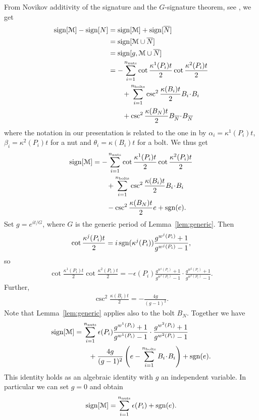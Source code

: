 \documentclass[a4paper,10pt,reqno]{amsart}
\newcommand{\nut}{P}
\newcommand{\bolt}{B}
\newcommand{\sgn}{\mathop{\rm sgn}}
\newcommand{\sign}{\mathop{\rm sign}}
\newcommand{\cM}{\mathcal{M}}
\theoremstyle{plain}
\newcommand{\nnuts}{n_{\text{\rm nuts}}}
\newcommand{\nbolts}{n_{\text{\rm bolts}}}
\numberwithin{equation}{section}
\begin{document}
From Novikov additivity of the signature and the $G$-signature theorem, see \cite[Prop.~6.18]{AS-III}, we get
\begin{align}
\sign[\cM] - \sign[N] 
&=\sign[\cM] + \sign[\overline{N}] \\
&= \sign[\cM \cup \overline{N}] \\
&= \sign[g,\cM \cup \overline{N}] \\
%
%
%
%
&= - \sum_{i=1}^{\nnuts} \cot\frac{\kappa^1(\nut_i) t}{2}\cot\frac{\kappa^2(\nut_i) t}{2} \\
&\qquad
+ \sum_{i=1}^{\nbolts} \csc^2 \frac{\kappa(\bolt_i) t}{2} B_i \! \cdot \! B_i \\
&\qquad
+ \csc^2 \frac{\kappa(\bolt_N) t}{2} B_{\overline{N}} \!\cdot\! B_{\overline{N}}
\end{align}
where the notation in our presentation is related to the one in \cite[Prop.~6.18]{AS-III} by 
$\alpha_i = \kappa^1(\nut_i) t$, $\beta_i = \kappa^2(\nut_i) t$ for a nut and $\theta_i = \kappa(\bolt_i) t$ for a bolt.
We thus get
\begin{align}
\sign[\cM] 
&= - \sum_{i=1}^{\nnuts} \cot\frac{\kappa^1(\nut_i) t}{2}\cot\frac{\kappa^2(\nut_i) t}{2} \\
&\qquad
+ \sum_{i=1}^{\nbolts} \csc^2 \frac{\kappa(\bolt_i) t}{2} B_i \!\cdot\! B_i \\
&\qquad
- \csc^2 \frac{\kappa(\bolt_N) t}{2} e  +\sgn(e).
\end{align}
Set $g = e^{it/G}$, where $G$ is the generic period of Lemma~\ref{lem:generic}. Then
\begin{align}
\cot\frac{\kappa^j(\nut_i) t}{2} 
= i \sgn(\kappa^j(\nut_i)) \frac{g^{w^j(\nut_i)} + 1}{g^{w^j(\nut_i)} - 1},
\end{align}
so 
\begin{align}
\cot\frac{\kappa^1(\nut_i) t}{2} 
\cot\frac{\kappa^2(\nut_i) t}{2} 
= - \epsilon(\nut_i) 
\frac{g^{w^1(\nut_i)} + 1}{g^{w^1(\nut_i)} - 1} \cdot 
\frac{g^{w^2(\nut_i)} + 1}{g^{w^2(\nut_i)} - 1}.
\end{align}
Further, 
\begin{align}
\csc^2 \frac{\kappa(\bolt_i) t}{2} 
= -\frac{4g}{(g-1)^2}.
\end{align}
Note that Lemma~\ref{lem:generic} applies also to the bolt $B_N$. Together we have 
\begin{align} \label{eq:G-sign}
\sign[\cM] 
&= 
\sum_{i=1}^{\nnuts} \epsilon(\nut_i) 
\frac{g^{w^1(\nut_i)} + 1}{g^{w^1(\nut_i)} - 1} \cdot 
\frac{g^{w^2(\nut_i)} + 1}{g^{w^2(\nut_i)} - 1} \nonumber \\
&\qquad
+ \frac{4g}{(g-1)^2} \left( e - \sum_{i=1}^{\nbolts} B_i \!\cdot\! B_i \right) 
+ \sgn(e).
\end{align}
This identity holds as an algebraic identity with $g$ an independent variable. In particular we can set $g=0$ and obtain  
\begin{align} \label{eq:G-sign-g0}
\sign[\cM] = \sum_{i=1}^{\nnuts} \epsilon(\nut_i) + \sgn(e) .
\end{align} 
\end{document}
